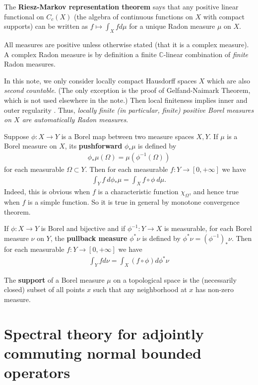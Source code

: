 \documentclass[12pt,b5paper,notitlepage]{article}
\theoremstyle{definition}
\theoremstyle{plain}
\newcommand{\Cbb}{\mathbb C}
\numberwithin{equation}{section}
\begin{document}
The \textbf{Riesz-Markov representation theorem} \cite[Thm.2.14]{Rud-R} says that any positive linear functional on $C_c(X)$ (the algebra of continuous functions on $X$ with compact supports) can be written as $f\mapsto\int_Xfd\mu$ for a unique Radon measure $\mu$ on $X$.

All measures are positive unless otherwise stated (that it is a complex measure). A complex Radon measure is by definition a finite $\Cbb$-linear combination of \textit{finite} Radon measures. 

In this note, we only consider  locally compact Hausdorff spaces $X$ which are also \textit{second countable}. (The only exception is the proof of Gelfand-Naimark Theorem, which is not used elsewhere in the note.) Then local finiteness implies inner and outer regularity \cite[Thm. 2.18]{Rud-R}. Thus, \textit{locally finite (in particular, finite) positive Borel measures on $X$ are automatically Radon measures}.

Suppose $\phi:X\rightarrow Y$ is a Borel map between two measure spaces $X,Y$. If $\mu$ is a Borel measure on $X$, its \textbf{pushforward} $\phi_*\mu$ is defined by
\begin{align*}
\phi_*\mu(\Omega)=\mu(\phi^{-1}(\Omega))	
\end{align*}
for each measurable $\Omega\subset Y$. Then for each  measurable $f:Y\rightarrow[0,+\infty]$ we have
\begin{align}
\int_Y f~d\phi_*\mu=\int_X f\circ\phi ~d\mu.	\label{eq16}
\end{align}
Indeed, this is obvious when $f$ is a characteristic function $\chi_\Omega$, and hence true when $f$ is a simple function. So it is true in general by monotone convergence theorem.

If $\phi:X\rightarrow Y$ is Borel and bijective and if $\phi^{-1}:Y\rightarrow X$ is measurable, for each Borel measure $\nu$ on $Y$, the \textbf{pullback measure}   $\phi^*\nu$ is defined by $\phi^*\nu=(\phi^{-1})_*\nu$. Then for each measurable $f:Y\rightarrow[0,+\infty]$ we have
\begin{align}\label{eq26}
\int_Y fd\nu=\int_X (f\circ\phi)d\phi^*\nu
\end{align}

The \textbf{support} of a Borel  measure $\mu$ on a topological space is the (necessarily closed) subset of all points $x$ such that any neighborhood at $x$ has non-zero measure.



\section{Spectral theory for adjointly commuting normal bounded operators}\label{lb65}
\end{document}
